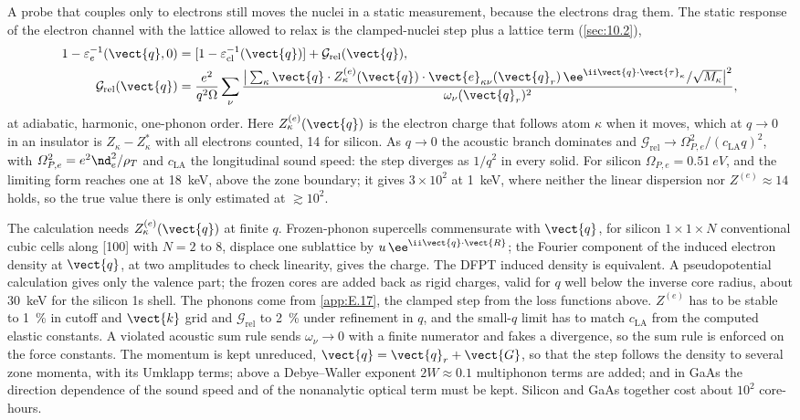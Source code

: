 A probe that couples only to electrons still moves the nuclei in a static measurement, because the electrons drag them. The static response of the electron channel with the lattice allowed to relax is the clamped-nuclei step plus a lattice term (\cref{sec:10.2}),
\begin{align}
  1 - \varepsilon_e^{-1}(\vect{q},0) &= [1 - \varepsilon^{-1}_{\mathrm{cl}}(\vect{q})] + \mathcal{G}_{\mathrm{rel}}(\vect{q}) , \nonumber\\
  \mathcal{G}_{\mathrm{rel}}(\vect{q}) &= \frac{e^2}{q^2\Omega}\sum_\nu\frac{\big|\sum_\kappa\vect{q}\cdot Z^{(e)}_\kappa(\vect{q})\cdot\vect{e}_{\kappa\nu}(\vect{q}_r)\,\ee^{\ii\vect{q}\cdot\vect{\tau}_\kappa}/\sqrt{M_\kappa}\big|^2}{\omega_\nu(\vect{q}_r)^2} ,
  \label{eq:E.16-step}
\end{align}
at adiabatic, harmonic, one-phonon order. Here $Z^{(e)}_\kappa(\vect{q})$ is the electron charge that follows atom $\kappa$ when it moves, which at $q\to0$ in an insulator is $Z_\kappa - Z^*_\kappa$ with all electrons counted, 14 for silicon. As $q\to0$ the acoustic branch dominates and $\mathcal{G}_{\mathrm{rel}} \to \varOmega_{P,e}^2/(c_{\mathrm{LA}}q)^2$, with $\varOmega_{P,e}^2 = e^2\nd_e^2/\rho_T$ and $c_{\mathrm{LA}}$ the longitudinal sound speed: the step diverges as $1/q^2$ in every solid. For silicon $\varOmega_{P,e} = \SI{0.51}{eV}$, and the limiting form reaches one at \SI{18}{keV}, above the zone boundary; it gives $3\times10^2$ at \SI{1}{keV}, where neither the linear dispersion nor $Z^{(e)} \approx 14$ holds, so the true value there is only estimated at $\gtrsim10^2$.

The calculation needs $Z^{(e)}_\kappa(\vect{q})$ at finite $q$. Frozen-phonon supercells commensurate with $\vect{q}$, for silicon $1\times1\times N$ conventional cubic cells along [100] with $N = 2$ to 8, displace one sublattice by $u\,\ee^{\ii\vect{q}\cdot\vect{R}}$; the Fourier component of the induced electron density at $\vect{q}$, at two amplitudes to check linearity, gives the charge. The DFPT induced density is equivalent. A pseudopotential calculation gives only the valence part; the frozen cores are added back as rigid charges, valid for $q$ well below the inverse core radius, about \SI{30}{keV} for the silicon 1s shell. The phonons come from \cref{app:E.17}, the clamped step from the loss functions above. $Z^{(e)}$ has to be stable to \SI{1}{\percent} in cutoff and $\vect{k}$ grid and $\mathcal{G}_{\mathrm{rel}}$ to \SI{2}{\percent} under refinement in $q$, and the small-$q$ limit has to match $c_{\mathrm{LA}}$ from the computed elastic constants. A violated acoustic sum rule sends $\omega_\nu \to 0$ with a finite numerator and fakes a divergence, so the sum rule is enforced on the force constants. The momentum is kept unreduced, $\vect{q} = \vect{q}_r + \vect{G}$, so that the step follows the density to several zone momenta, with its Umklapp terms; above a Debye--Waller exponent $2W \approx 0.1$ multiphonon terms are added; and in GaAs the direction dependence of the sound speed and of the nonanalytic optical term must be kept. Silicon and GaAs together cost about $10^2$ core-hours.

